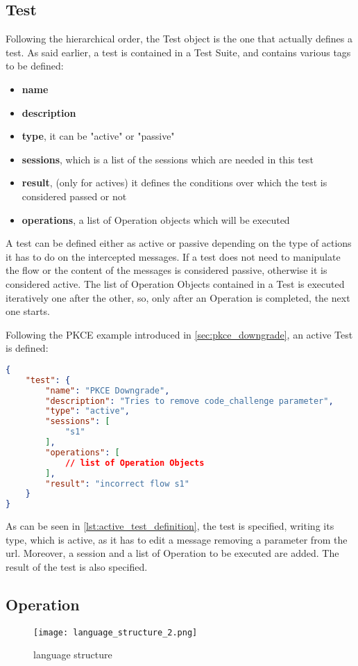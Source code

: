 \subsection{Test}
Following the hierarchical order, the Test object is the one that actually defines a test. As said earlier, a test is contained in a Test Suite, and contains various tags to be defined:
\begin{itemize}
    \item \textbf{name}
    \item \textbf{description}
    \item \textbf{type}, it can be "active" or "passive"
    \item \textbf{sessions}, which is a list of the sessions which are needed in this test
    \item \textbf{result}, (only for actives) it defines the conditions over which the test is considered passed or not
    \item \textbf{operations}, a list of Operation objects which will be executed
\end{itemize}
A test can be defined either as active or passive depending on the type of actions it has to do on the intercepted messages. If a test does not need to manipulate the flow or the content of the messages is considered passive, otherwise it is considered active.
The list of Operation Objects contained in a Test is executed iteratively one after the other, so, only after an Operation is completed, the next one starts.

Following the PKCE example introduced in \ref{sec:pkce_downgrade}, an active Test is defined:

\begin{lstlisting}[language=json, caption=Active test definition, label={lst:active_test_definition}]
{
    "test": {
        "name": "PKCE Downgrade",
        "description": "Tries to remove code_challenge parameter",
        "type": "active",
        "sessions": [
            "s1"
        ],
        "operations": [
            // list of Operation Objects
        ],
        "result": "incorrect flow s1"
    }
}    
\end{lstlisting}

As can be seen in \ref{lst:active_test_definition}, the test is specified, writing its type, which is active, as it has to edit a message removing a parameter from the url. Moreover, a session and a list of Operation to be executed are added. The result of the test is also specified.

\subsection{Operation}
\begin{wrapfigure}{r}{0.4\textwidth}
    \texttt{[image: language\_structure\_2.png]}
    \caption{language structure}
    \label{fig:language_structure_2}
\end{wrapfigure}

